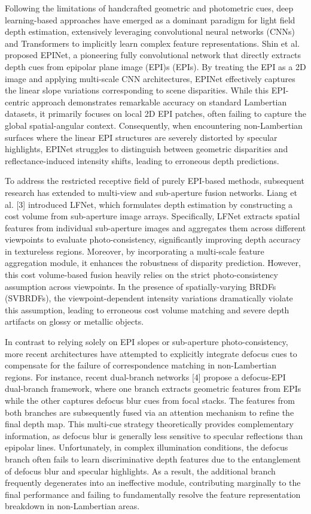 Following the limitations of handcrafted geometric and photometric cues, deep learning-based approaches have emerged as a dominant paradigm for light field depth estimation, extensively leveraging convolutional neural networks (CNNs) and Transformers to implicitly learn complex feature representations. Shin et al.  proposed EPINet, a pioneering fully convolutional network that directly extracts depth cues from epipolar plane image (EPI)s (EPIs). By treating the EPI as a 2D image and applying multi-scale CNN architectures, EPINet effectively captures the linear slope variations corresponding to scene disparities. While this EPI-centric approach demonstrates remarkable accuracy on standard Lambertian datasets, it primarily focuses on local 2D EPI patches, often failing to capture the global spatial-angular context. Consequently, when encountering non-Lambertian surfaces where the linear EPI structures are severely distorted by specular highlights, EPINet struggles to distinguish between geometric disparities and reflectance-induced intensity shifts, leading to erroneous depth predictions.

To address the restricted receptive field of purely EPI-based methods, subsequent research has extended to multi-view and sub-aperture fusion networks. Liang et al. [3] introduced LFNet, which formulates depth estimation by constructing a cost volume from sub-aperture image arrays. Specifically, LFNet extracts spatial features from individual sub-aperture images and aggregates them across different viewpoints to evaluate photo-consistency, significantly improving depth accuracy in textureless regions. Moreover, by incorporating a multi-scale feature aggregation module, it enhances the robustness of disparity prediction. However, this cost volume-based fusion heavily relies on the strict photo-consistency assumption across viewpoints. In the presence of spatially-varying BRDFs (SVBRDFs), the viewpoint-dependent intensity variations dramatically violate this assumption, leading to erroneous cost volume matching and severe depth artifacts on glossy or metallic objects.

In contrast to relying solely on EPI slopes or sub-aperture photo-consistency, more recent architectures have attempted to explicitly integrate defocus cues to compensate for the failure of correspondence matching in non-Lambertian regions. For instance, recent dual-branch networks [4] propose a defocus-EPI dual-branch framework, where one branch extracts geometric features from EPIs while the other captures defocus blur cues from focal stacks. The features from both branches are subsequently fused via an attention mechanism to refine the final depth map. This multi-cue strategy theoretically provides complementary information, as defocus blur is generally less sensitive to specular reflections than epipolar lines. Unfortunately, in complex illumination conditions, the defocus branch often fails to learn discriminative depth features due to the entanglement of defocus blur and specular highlights. As a result, the additional branch frequently degenerates into an ineffective module, contributing marginally to the final performance and failing to fundamentally resolve the feature representation breakdown in non-Lambertian areas.

